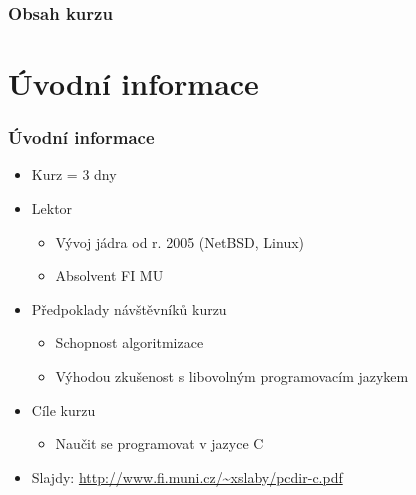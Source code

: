 


\date{7.--9. 12. \the\year}

\pcdirctrue

\newif\ifheapemph



\frame{\titlepage}


\begin{frame}
  \frametitle{Obsah kurzu}
  \tableofcontents
\end{frame}

\iftrue

\section{Úvodní informace}
\frame{\sectionpage}

\begin{frame}
  \frametitle{Úvodní informace}
  \begin{itemize}
    \item Kurz = 3 dny

    \pause

    \item Lektor
    \begin{itemize}
      \item Vývoj jádra od r. 2005 (NetBSD, Linux)
      \item Absolvent FI MU
    \end{itemize}

    \pause

    \item Předpoklady návštěvníků kurzu
    \begin{itemize}
      \item Schopnost algoritmizace
      \item Výhodou zkušenost s libovolným programovacím jazykem
    \end{itemize}

    \pause

    \item Cíle kurzu
    \begin{itemize}
      \item Naučit se programovat v jazyce C
    \end{itemize}

    \pause

    \item Slajdy: \url{http://www.fi.muni.cz/~xslaby/pcdir-c.pdf}

  \end{itemize}

\end{frame}

